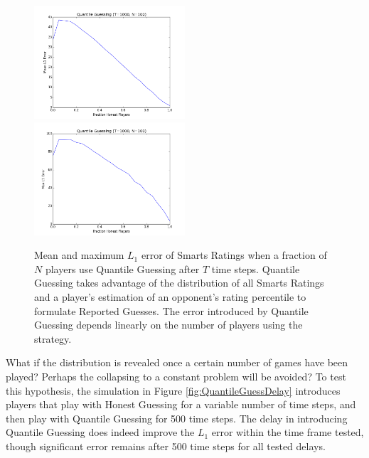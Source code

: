 \begin{figure}[H]
\centerline{%
\includegraphics[width=0.5\textwidth]{figures/robustness/Quantile_Guessing31.png}%
\includegraphics[width=0.5\textwidth] {figures/robustness/Quantile_Guessing32.png}%
}%
\caption{Mean and maximum $L_1$ error of Smarts Ratings when a fraction of $N$ players use Quantile Guessing after $T$ time steps. Quantile Guessing takes advantage of the distribution of all Smarts Ratings and a player's estimation of an opponent's rating percentile to formulate Reported Guesses. The error introduced by Quantile Guessing depends linearly on the number of players using the strategy.}
\label{fig:QuantileGuessFrac}
\end{figure}

What if the distribution is revealed once a certain number of games have been played? Perhaps the collapsing to a constant problem will be avoided? To test this hypothesis, the simulation in Figure \ref{fig:QuantileGuessDelay} introduces players that play with Honest Guessing for a variable number of time steps, and then play with Quantile Guessing for 500 time steps. The delay in introducing Quantile Guessing does indeed improve the $L_1$ error within the time frame tested, though significant error remains after 500 time steps for all tested delays. 

